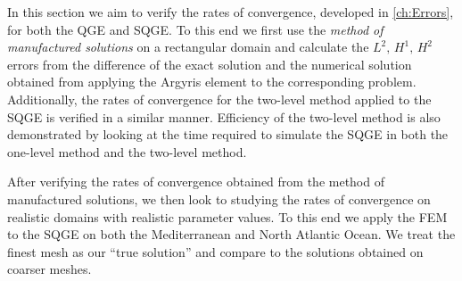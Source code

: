 In this section we aim to verify the rates of convergence, developed in
\autoref{ch:Errors}, for both the QGE and SQGE. To this end we first use the
\emph{method of manufactured solutions} on a rectangular domain and calculate the
$L^2,\,H^1,\,H^2$ errors from the difference of the exact solution and the
numerical solution obtained from applying the Argyris element to the
corresponding problem. Additionally, the rates of convergence for the two-level
method applied to the SQGE is verified in a similar manner. Efficiency of the
two-level method is also demonstrated by looking at the time required to
simulate the SQGE in both the one-level method and the two-level method.

After verifying the rates of convergence obtained from the method of
manufactured solutions, we then look to studying the rates of convergence on
realistic domains with realistic parameter values. To this end we apply the FEM
to the SQGE on both the Mediterranean and North Atlantic Ocean. We treat the
finest mesh as our ``true solution'' and compare to the solutions obtained on
coarser meshes.
